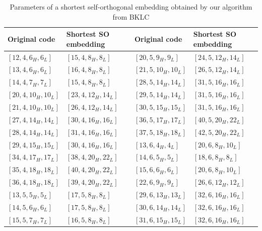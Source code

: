 \documentclass{article}
\theoremstyle{definition}
\theoremstyle{remark}
\begin{document}
\begin{table}[htbp]
\centering
\begin{tabular}{l|l||l|l}
\toprule
Original code & Shortest SO embedding & Original code & Shortest SO embedding \\
\midrule
$[12,4,6_H,6_L]$ & $[15,4,8_H,8_L]$ & $[20,5,9_H,9_L]$ & $[24,5,12_H,14_L]$ \\
\hline
$[13,4,6_H,6_L]$ & $[16,4,8_H,8_L]$ & $[21,5,10_H,10_L]$ & $[26,5,12_H,14_L]$ \\
\hline
$[14,4,7_H,7_L]$ & $[15,4,8_H,8_L]$ & $[28,5,14_H,14_L]$ & $[31,5,16_H,16_L]$ \\
\hline
$[20,4,10_H,10_L]$ & $[23,4,12_H,14_L]$ & $[29,5,14_H,14_L]$ & $[31,5,16_H,16_L]$ \\
\hline
$[21,4,10_H,10_L]$ & $[26,4,12_H,14_L]$ & $[30,5,15_H,15_L]$ & $[31,5,16_H,16_L]$ \\
\hline
$[27,4,14_H,14_L]$ & $[30,4,16_H,16_L]$ & $[36,5,17_H,17_L]$ & $[40,5,20_H,22_L]$ \\
\hline
$[28,4,14_H,14_L]$ & $[31,4,16_H,16_L]$ & $[37,5,18_H,18_L]$ & $[42,5,20_H,22_L]$ \\
\hline
$[29,4,15_H,15_L]$ & $[30,4,16_H,16_L]$ & $[13,6,4_H,4_L]$ & $[20,6,8_H,10_L]$ \\
\hline
$[34,4,17_H,17_L]$ & $[38,4,20_H,22_L]$ & $[14,6,5_H,5_L]$ & $[18,6,8_H,8_L]$ \\
\hline
$[35,4,18_H,18_L]$ & $[40,4,20_H,22_L]$ & $[15,6,6_H,6_L]$ & $[20,6,8_H,10_L]$ \\
\hline
$[36,4,18_H,18_L]$ & $[39,4,20_H,22_L]$ & $[22,6,9_H,9_L]$ & $[26,6,12_H,12_L]$ \\
\hline
$[13,5,5_H,5_L]$ & $[17,5,8_H,8_L]$ & $[29,6,13_H,13_L]$ & $[32,6,16_H,16_L]$ \\
\hline
$[14,5,6_H,6_L]$ & $[17,5,8_H,8_L]$ & $[30,6,14_H,14_L]$ & $[32,6,16_H,16_L]$ \\
\hline
$[15,5,7_H,7_L]$ & $[16,5,8_H,8_L]$ & $[31,6,15_H,15_L]$ & $[32,6,16_H,16_L]$ \\
\bottomrule
\end{tabular}
\caption{Parameters of a shortest self-orthogonal embedding obtained by our algorithm from BKLC}
\label{Z_4embeddingtable}
\end{table}
\end{document}
